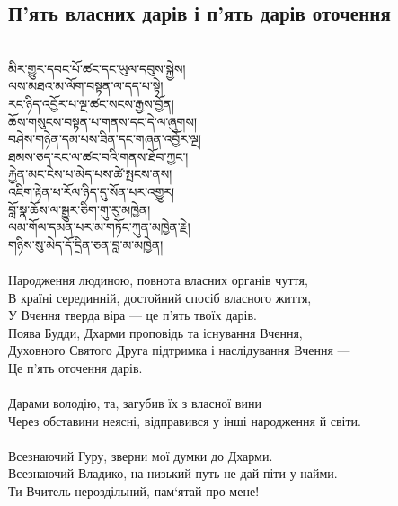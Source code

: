 \subsection*{П'ять власних дарів і п'ять дарів оточення}
\\
\ti
མིར་གྱུར་དབང་པོ་ཚང་དང་ཡུལ་དབུས་སྐྱེས།\\
ལས་མཐའ་མ་ལོག་བསྟན་ལ་དད་པ་སྟེ།\\
རང་ཉིད་འབྱོར་པ་ལྔ་ཚང་སངས་རྒྱས་བྱོན། \\
ཆོས་གསུངས་བསྟན་པ་གནས་དང་དེ་ལ་ཞུགས།\\
བཤེས་གཉེན་དམ་པས་ཟིན་དང་གཞན་འབྱོར་ལྔ།\\
ཐམས་ཅད་རང་ལ་ཚང་བའི་གནས་ཐོབ་ཀྱང༌།\\
རྐྱེན་མང་ངེས་པ་མེད་པས་ཚེ་སྤངས་ནས།\\
འཇིག་རྟེན་ཕ་རོལ་ཉིད་དུ་སོན་པར་འགྱུར།\\
བློ་སྣ་ཆོས་ལ་སྒྱུར་ཅིག་གུ་རུ་མཁྱེན།\\
ལམ་གོལ་དམན་པར་མ་གཏོང་ཀུན་མཁྱེན་རྗེ།\\
གཉིས་སུ་མེད་དོ་དྲིན་ཅན་བླ་མ་མཁྱེན།\\
\\
\ru
Народження людиною, повнота власних органів чуття,\\
В країні серединній, достойний спосіб власного життя,\\
У Вчення тверда віра --- це п'ять твоїх дарів.\\
Поява Будди, Дхарми проповідь та існування Вчення,\\
Духовного Святого Друга підтримка і наслідування Вчення ---\\
Це п'ять оточення дарів.\\
\\
Дарами володію, та, загубив їх з власної вини\\
Через обставини неясні, відправився у інші народження й світи.\\
\\
Всезнаючий Гуру, зверни мої думки до Дхарми.\\
Всезнаючий Владико, на низький путь не дай піти у найми.\\
Ти Вчитель нероздільний, пам`ятай про мене!\\

\newpage
